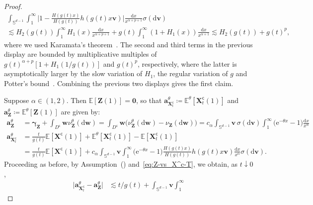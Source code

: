 \documentclass[en,oneside,bbfont,article]{amsart}
\theoremstyle{remark}
\theoremstyle{definition}
\theoremstyle{definition}
\newcommand\Sp{\mathbb{S}}
\newcommand\E{\mathds{E}}
\newcommand\e{\mathord{\mathrm{e}}}
\newcommand\1{\mathds{1}}
\newcommand\da{\downarrow}
\newcommand\co{\mathsf{c}}
\newcommand{\D}{\mathrm{d}}
\begin{document}
\begin{proof}
\begin{multline*}
\int_{\Sp^{d-1}}\int_1^\infty \bigg|1-\frac{H(g(t)x)}{H(g(t))}h(g(t)x\bm{v})\bigg| 
\frac{\D x}{x^{\alpha+p+1}}\sigma(\D \bm{v})\\
\lesssim 
H_2(g(t))\int_1^\infty H_1(x)
\frac{\D x}{x^{\alpha+p+1}}
+ g(t)\int_1^\infty 
(1+H_1(x))\frac{\D x}{x^{\alpha+1}}
\lesssim 
H_2(g(t))
+g(t)^p,
\end{multline*}
where we used Karamata's theorem~\cite[Thm~1.5.11]{MR1015093}. The second and third terms in the previous display are bounded by multiplicative multiples of $g(t)^{\alpha+p}[1+H_1(1/g(t))]$ and $g(t)^p$, respectively, where the latter is asymptotically larger by the slow variation of $H_1$, the regular variation of $g$ and Potter's bound~\cite[Thm~1.5.6]{MR1015093}. Combining the previous two displays gives the first claim. 

Suppose $\alpha\in(1,2)$. Then $\E[\bm{Z}(1)]=\bm{0}$, so that $\bm{a}_{\bm{X}_t^\co}^\theta\coloneqq\E^\theta[\bm{X}_t^\co(1)]$ and $\bm{a}_{\bm{Z}}^\theta\coloneqq\E^\theta[\bm{Z}(1)]$ are given by:
\begin{align*}
\bm{a}_{\bm{Z}}^\theta 
&= \bm{\gamma}_{\bm{Z}}+\int_{D^\co }\bm{w}\nu_{\bm{Z}}^\theta(\D\bm{w})
=\int_{D^\co }\bm{w}\big(\nu_{\bm{Z}}^\theta(\D\bm{w}) - \nu_{\bm{Z}}(\D\bm{w})\big)
=c_\alpha\int_{\Sp^{d-1}}\bm{v}\,\sigma(\D\bm{v})\int_1^\infty \big(\e^{-\theta x}-1\big)\frac{\D x}{x^{\alpha}}\\
\bm{a}_{\bm{X}_t^\co}^\theta
&= \frac{t}{g(t)}\E[\bm{X}^\co(1)]
+\E^\theta[\bm{X}_t^\co(1)]-\E[\bm{X}_t^\co(1)]\\
&=\frac{t}{g(t)}\E[\bm{X}^\co(1)]
+c_\alpha\!\int_{\Sp^{d-1}}\!\!\bm{v}\int_1^\infty\!\!
\big(\e^{-\theta x}-1\big)
\frac{H(g(t)x)}{H(g(t))}h(g(t)x\bm{v})
\frac{\D x}{x^{\alpha}}\sigma(\D\bm{v}). 
\end{align*} 
Proceeding as before, by Assumption~() and~\eqref{eq:Z-vs_X^c-T}, we obtain, as $t \da 0$,
\begin{align*}
\big|\bm{a}_{\bm{X}_t^\co}^\theta
-\bm{a}_{\bm{Z}}^\theta\big| 
&\lesssim t/g(t)
+\int_{\Sp^{d-1}}\!\!\bm{v}\int_1^\infty

\end{align*}
\end{proof}
\end{document}
